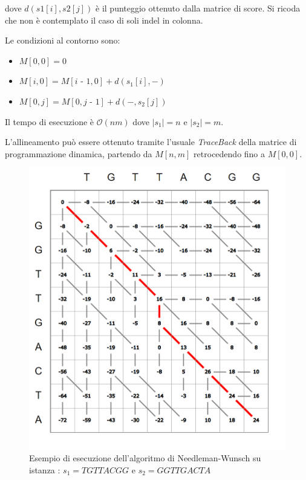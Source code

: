 dove $d(s1[i],s2[j])$ è il punteggio ottenuto dalla matrice di score. Si ricoda che non è contemplato il caso di soli indel in colonna.

Le condizioni al contorno sono:

\begin{itemize}
    \item $M[0,0]=0$
    \item $M[i,0]=M[i \textrm{ - } 1,0] + d(s_1[i],-)$
    \item $M[0,j]=M[0,j \textrm{ - } 1] + d(-,s_2[j])$
\end{itemize}

Il tempo di esecuzione è $\mathcal{O}(nm)$ dove $|s_1|=n$ e $|s_2|=m$.

L'allineamento può essere ottenuto tramite l'usuale \textit{TraceBack} della matrice di programmazione dinamica, partendo da $M[n,m]$ retrocedendo fino a $M[0,0]$.

\begin{figure}[ht]
    \centering
    \includegraphics[scale=0.45]{images/esempio nw.PNG}
    \caption{Esempio di esecuzione dell'algoritmo di Needleman-Wunsch su istanza : $s_1=TGTTACGG$ e $s_2=GGTTGACTA$}
    \label{fig:nw}
\end{figure}

